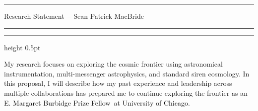 \documentclass[11pt]{article}
\newcommand{\tcolor}{black}
\newcommand{\yourname}{Sean Patrick MacBride}
\newcommand{\soptitle}{Research Statement}
\newcommand{\Institute}{\textcolor{\tcolor}{University of Chicago}}
\newcommand{\Position}{\textcolor{\tcolor}{E. Margaret Burbidge Prize Fellow}}
\begin{document}
\hrule
\begin{center}
    \Large\soptitle\ -- \yourname
\end{center}
\vspace{0pt}
\hrule
\vspace{0.5pt}
\hrule height 0.5pt
\vspace{3pt}

\normalsize
\noindent My research focuses on exploring the cosmic frontier using astronomical instrumentation, multi-messenger astrophysics, and standard siren cosmology.
In this proposal, I will describe how my past experience and leadership across multiple collaborations has prepared me to continue exploring the frontier as an \Position\ at \Institute.

  
\end{document}

